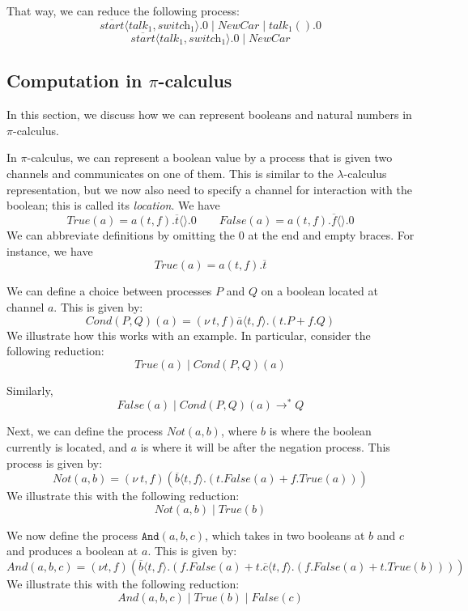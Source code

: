 \documentclass[a4paper, openany]{memoir}
\theoremstyle{definition}
\begin{document}
    That way, we can reduce the following process:
    \[\overline{\textit{start}} \langle \textit{talk}_1, \textit{switch}_1 \rangle.0 \mid \textit{NewCar} \mid \textit{talk}_1().0\]
    \[\overline{\textit{start}} \langle \textit{talk}_1, \textit{switch}_1 \rangle.0 \mid \textit{NewCar}\]

    \subsection{Computation in $\pi$-calculus}
    In this section, we discuss how we can represent booleans and natural numbers in $\pi$-calculus.

    In $\pi$-calculus, we can represent a boolean value by a process that is given two channels and communicates on one of them. This is similar to the $\lambda$-calculus representation, but we now also need to specify a channel for interaction with the boolean; this is called its \emph{location}. We have
    \[\textit{True}(a) = a(t, f).\overline{t}\langle\rangle.0 \qquad \textit{False}(a) = a(t, f).\overline{f}\langle\rangle.0\]
    We can abbreviate definitions by omitting the $0$ at the end and empty braces. For instance, we have
    \[\textit{True}(a) = a(t, f).\overline{t}\]

    We can define a choice between processes $P$ and $Q$ on a boolean located at channel $a$. This is given by:
    \[\textit{Cond}(P, Q)(a) = (\nu \ t, f)\overline{a} \langle t, f \rangle.(t.P + f.Q)\]
    We illustrate how this works with an example. In particular, consider the following reduction:
    \[\textit{True}(a) \mid \textit{Cond}(P, Q)(a)\]

    Similarly,
    \[\textit{False}(a) \mid \textit{Cond}(P, Q)(a) \to^* Q\]

    Next, we can define the process $\textit{Not}(a, b)$, where $b$ is where the boolean currently is located, and $a$ is where it will be after the negation process. This process is given by:
    \[\textit{Not}(a, b) = (\nu \ t, f)(\overline{b} \langle t, f \rangle.(
        t.\textit{False}(a) + f.\textit{True}(a)
    ))\]
    We illustrate this with the following reduction:
    \[\textit{Not}(a, b) \mid \textit{True}(b)\]

    We now define the process $\texttt{And}(a, b, c)$, which takes in two booleans at $b$ and $c$ and produces a boolean at $a$. This is given by:
    \[\textit{And}(a, b, c) = (\nu t, f)(\overline{b} \langle t, f \rangle.(
        f.\textit{False}(a) + t.\overline{c} \langle t, f \rangle.(
            f.\textit{False}(a) + t.\textit{True}(b)
        )
    ))\]
    We illustrate this with the following reduction:
    \[\textit{And}(a, b, c) \mid \textit{True}(b) \mid \textit{False}(c)\]
\end{document}
